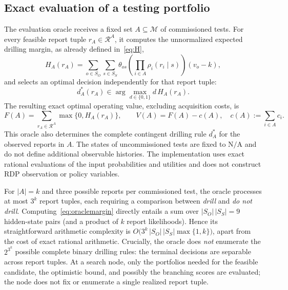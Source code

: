 \documentclass[11pt,a4paper]{article}
\newcommand{\calM}{\mathcal{M}}
\newcommand{\calR}{\mathcal{R}}
\begin{document}
\subsection{Exact evaluation of a testing portfolio}\label{sec:subprob}
The evaluation oracle receives a fixed set $A\subseteq\calM$ of commissioned tests. For every feasible report tuple $r_A\in\calR^A$, it computes the unnormalized expected drilling margin, as already defined in~\eqref{eq:H},
\begin{equation}\label{eq:oraclemargin}
 H_A(r_A)
 =\sum_{o\in S_O}\sum_{s\in S_S}
   \theta_{os}\left(\prod_{i\in A}\rho_i(r_i\mid s)\right)(v_o-k),
\end{equation}
and selects an optimal decision independently for that report tuple:
\begin{equation}\label{eq:oracledrill}
 d_A^*(r_A)\in\arg\max_{d\in\{0,1\}}d\,H_A(r_A).
\end{equation}
The resulting exact optimal operating value, excluding acquisition costs, is
\begin{equation}\label{eq:oraclevalue}
 F(A)=\sum_{r_A\in\calR^A}\max\{0,H_A(r_A)\},
 \qquad V(A)=F(A)-c(A),\quad c(A):=\sum_{i\in A}c_i.
\end{equation}
This oracle also determines the complete contingent drilling rule $d_A^*$ for the observed reports in $A$. The states of uncommissioned tests are fixed to $\mathrm{N/A}$ and do not define additional observable histories. The implementation uses exact rational evaluations of the input probabilities and utilities and does not construct RDP observation or policy variables.

For $|A|=k$ and three possible reports per commissioned test, the oracle processes at most $3^k$ report tuples, each requiring a comparison between \emph{drill} and \emph{do not drill}. Computing~\eqref{eq:oraclemargin} directly entails a sum over $|S_O|\,|S_S|=9$ hidden-state pairs (and a product of $k$ report likelihoods). Hence its straightforward arithmetic complexity is $O\bigl(3^k\,|S_O|\,|S_S|\max\{1,k\}\bigr)$, apart from the cost of exact rational arithmetic. Crucially, the oracle does \emph{not} enumerate the $2^{3^k}$ possible complete binary drilling rules: the terminal decisions are separable across report tuples. At a search node, only the portfolios needed for the feasible candidate, the optimistic bound, and possibly the branching scores are evaluated; the node does not fix or enumerate a single realized report tuple.
\end{document}
